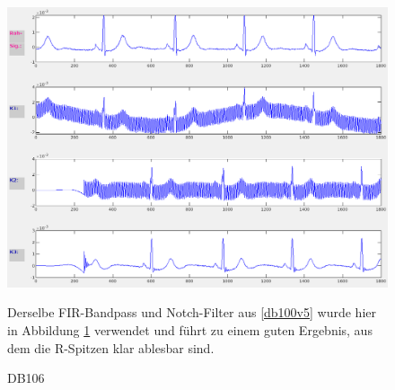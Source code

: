 \documentclass[a4paper,12pt,titlepage]{scrartcl}
\begin{document}
\begin{figure}[ht]
    \begin{minipage}[t]{0.5\linewidth}
        \centering
        \includegraphics[width=0.9\linewidth, valign=t]{Assets/LaborBMT-15-54-32.png}
        \caption{DB106}
        \label{db106}
    \end{minipage}%
    \begin{minipage}[t]{0.5\linewidth}
        Derselbe FIR-Bandpass und Notch-Filter aus \ref{db100v5} wurde hier in Abbildung \ref{db106} verwendet und führt zu einem guten Ergebnis, aus dem die R-Spitzen klar ablesbar sind.
    \end{minipage}
\end{figure}
\end{document}
